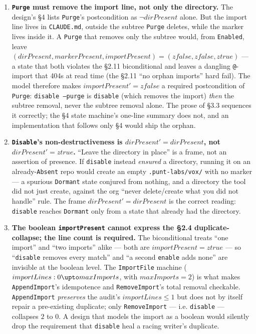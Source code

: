 \documentclass[a4paper,10pt,fleqn]{article}
\begin{document}
\begin{enumerate}
  \item \textbf{\texttt{Purge} must remove the import line, not only the
    directory.} The design's \S4 lists \texttt{Purge}'s postcondition as
    $\neg dirPresent$ alone. But the import line lives in \texttt{CLAUDE.md},
    outside the subtree \texttt{Purge} deletes, while the marker lives inside it.
    A \texttt{Purge} that removes only the subtree would, from \texttt{Enabled},
    leave $(dirPresent, markerPresent, importPresent) = (zfalse, zfalse, ztrue)$
    --- a state that both violates the \S2.11 biconditional and leaves a dangling
    \texttt{@}-import that 404s at read time (the \S2.11 ``no orphan imports''
    hard fail). The model therefore makes $importPresent' = zfalse$ a required
    postcondition of \texttt{Purge}: \texttt{disable --purge} is \texttt{disable}
    (which removes the import) \emph{then} the subtree removal, never the subtree
    removal alone. The prose of \S3.3 sequences it correctly; the \S4 state
    machine's one-line summary does not, and an implementation that follows only
    \S4 would ship the orphan.

  \item \textbf{\texttt{Disable}'s non-destructiveness is $dirPresent' =
    dirPresent$, not $dirPresent' = ztrue$.} ``Leave the directory in place'' is
    a frame, not an assertion of presence. If \texttt{disable} instead
    \emph{ensured} a directory, running it on an already-\texttt{Absent} repo
    would create an empty \texttt{.punt-labs/vox/} with no marker --- a spurious
    \texttt{Dormant} state conjured from nothing, and a directory the tool did
    not just create, against the org ``never delete/create what you did not
    handle'' rule. The frame $dirPresent' = dirPresent$ is the correct reading:
    \texttt{disable} reaches \texttt{Dormant} only from a state that already had
    the directory.

  \item \textbf{The boolean \texttt{importPresent} cannot express the \S2.4
    duplicate-collapse; the line count is required.} The biconditional treats
    ``one import'' and ``two imports'' alike --- both are $importPresent =
    ztrue$ --- so ``\texttt{disable} removes every match'' and ``a second
    \texttt{enable} adds none'' are invisible at the boolean level. The
    \texttt{ImportFile} machine ($importLines : 0 \upto maxImports$, with
    $maxImports = 2$) is what makes \texttt{AppendImport}'s idempotence and
    \texttt{RemoveImport}'s total removal checkable. \texttt{AppendImport}
    \emph{preserves} the audit's $importLines \leq 1$ but does not by itself
    repair a pre-existing duplicate; only \texttt{RemoveImport} --- i.e.
    \texttt{disable} --- collapses $2$ to $0$. A design that models the import as
    a boolean would silently drop the requirement that \texttt{disable} heal a
    racing writer's duplicate.


\end{enumerate}
\end{document}
